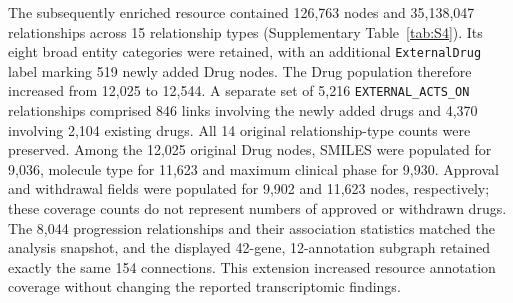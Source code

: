 The subsequently enriched resource contained 126,763 nodes and 35,138,047 relationships across 15 relationship types (Supplementary Table~\ref{tab:S4}). Its eight broad entity categories were retained, with an additional \texttt{ExternalDrug} label marking 519 newly added Drug nodes. The Drug population therefore increased from 12,025 to 12,544. A separate set of 5,216 \texttt{EXTERNAL\_ACTS\_ON} relationships comprised 846 links involving the newly added drugs and 4,370 involving 2,104 existing drugs. All 14 original relationship-type counts were preserved. Among the 12,025 original Drug nodes, SMILES were populated for 9,036, molecule type for 11,623 and maximum clinical phase for 9,930. Approval and withdrawal fields were populated for 9,902 and 11,623 nodes, respectively; these coverage counts do not represent numbers of approved or withdrawn drugs. The 8,044 progression relationships and their association statistics matched the analysis snapshot, and the displayed 42-gene, 12-annotation subgraph retained exactly the same 154 connections. This extension increased resource annotation coverage without changing the reported transcriptomic findings.

